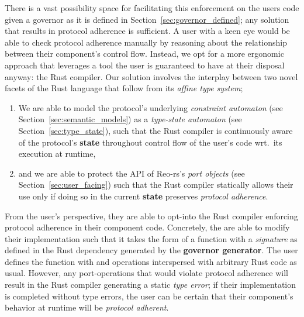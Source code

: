 There is a vast possibility space for facilitating this enforcement on the users code given a governor as it is defined in Section~\ref{sec:governor_defined}; any solution that results in protocol adherence is sufficient. A user with a keen eye would be able to check protocol adherence manually by reasoning about the relationship between their component's control flow. Instead, we opt for a more ergonomic approach that leverages a tool the user is guaranteed to have at their disposal anyway: the Rust compiler. Our solution involves the interplay between two novel facets of the Rust language that follow from its \textit{affine type system}; 
\begin{enumerate}
	\item We are able to model the protocol's underlying \textit{constraint automaton} (see Section~\ref{sec:semantic_models}) as a \textit{type-state automaton} (see Section~\ref{sec:type_state}), such that the Rust compiler is continuously aware of the protocol's \textbf{state} throughout control flow of the user's code wrt.\ its execution at runtime,
	
	\item and we are able to protect the API of Reo-rs's \textit{port objects} (see Section~\ref{sec:user_facing}) such that the Rust compiler statically allows their use only if doing so in the current \textbf{state} preserves \textit{protocol adherence}.
\end{enumerate}

From the user's perspective, they are able to opt-into the Rust compiler enforcing protocol adherence in their component code. Concretely, the are able to modify their implementation such that it takes the form of a function with a \textit{signature} as defined in the Rust dependency generated by the \textbf{governor generator}. The user defines the function with  and  operations interspersed with arbitrary Rust code as usual. However, any port-operations that would violate protocol adherence will result in the Rust compiler generating a static \textit{type error}; if their implementation is completed without type errors, the user can be certain that their component's behavior at runtime will be \textit{protocol adherent}.
%

%

